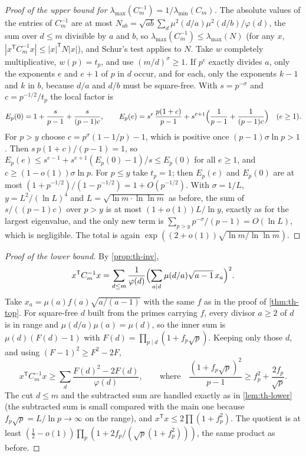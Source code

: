 \begin{proof}[Proof of the upper bound for $\lambda_{\max}(C_m^{-1}) = 1/\lambda_{\min}(C_m)$]
The absolute values of the entries of $C_m^{-1}$ are at most $N_{ab} = \sqrt{ab}\sum_d\mu^2(d/a)\mu^2(d/b)/\varphi(d)$, the sum over $d \le m$ divisible by $a$ and $b$, so $\lambda_{\max}(C_m^{-1}) \le \lambda_{\max}(N)$ (for any $x$, $|x^{\mathsf T}C_m^{-1}x| \le |x|^{\mathsf T}N|x|$), and Schur's test applies to $N$. Take $w$ completely multiplicative, $w(p) = t_p$, and use $(m/d)^\sigma \ge 1$. If $p^e$ exactly divides $a$, only the exponents $e$ and $e + 1$ of $p$ in $d$ occur, and for each, only the exponents $k - 1$ and $k$ in $b$, because $d/a$ and $d/b$ must be square-free. With $s = p^{-\sigma}$ and $c = p^{-1/2}/t_p$ the local factor is
\[
  E_p(0) = 1 + \frac{s}{p-1} + \frac{s}{(p-1)c}, \qquad E_p(e) = s^e\,\frac{p(1 + c)}{p-1} + s^{e+1}\Bigl(\frac{1}{p-1} + \frac{1}{(p-1)c}\Bigr) \quad (e \ge 1).
\]
For $p > y$ choose $c = p^\sigma(1 - 1/p) - 1$, which is positive once $(p-1)\sigma\ln p > 1$. Then $s\,p(1+c)/(p-1) = 1$, so $E_p(e) \le s^{e-1} + s^{e+1}(E_p(0) - 1)/s \le E_p(0)$ for all $e \ge 1$, and $c \ge (1 - o(1))\sigma\ln p$. For $p \le y$ take $t_p = 1$; then $E_p(e)$ and $E_p(0)$ are at most $(1 + p^{-1/2})/(1 - p^{-1/2}) = 1 + O(p^{-1/2})$. With $\sigma = 1/L$, $y = L^2/(\ln L)^4$ and $L = \sqrt{\ln m\cdot\ln\ln m}$ as before, the sum of $s/((p-1)c)$ over $p > y$ is at most $(1 + o(1))L/\ln y$, exactly as for the largest eigenvalue, and the only new term is $\sum_{p > y}p^{-\sigma}/(p-1) = O(\ln L)$, which is negligible. The total is again $\exp((2 + o(1))\sqrt{\ln m/\ln\ln m})$.
\end{proof}

\begin{proof}[Proof of the lower bound]
By \cref{prop:th-inv},
\[
  x^{\mathsf T}C_m^{-1}x = \sum_{d \le m}\frac{1}{\varphi(d)}\Bigl(\sum_{a \mid d}\mu(d/a)\sqrt{a-1}\,x_a\Bigr)^2.
\] Take $x_a = \mu(a)f(a)\sqrt{a/(a-1)}$ with the same $f$ as in the proof of \cref{thm:th-top}. For square-free $d$ built from the primes carrying $f$, every divisor $a \ge 2$ of $d$ is in range and $\mu(d/a)\mu(a) = \mu(d)$, so the inner sum is $\mu(d)(F(d) - 1)$ with $F(d) = \prod_{p \mid d}(1 + f_p\sqrt p)$. Keeping only those $d$, and using $(F - 1)^2 \ge F^2 - 2F$,
\[
  x^{\mathsf T}C_m^{-1}x \ge \sum_{d}\frac{F(d)^2 - 2F(d)}{\varphi(d)}, \qquad \text{where}\quad \frac{(1 + f_p\sqrt p)^2}{p-1} \ge f_p^2 + \frac{2f_p}{\sqrt p}.
\]
The cut $d \le m$ and the subtracted sum are handled exactly as in \cref{lem:th-lower} (the subtracted sum is small compared with the main one because $f_p\sqrt p = L/\ln p \to \infty$ on the range), and $x^{\mathsf T}x \le 2\prod(1 + f_p^2)$. The quotient is at least $(\frac12 - o(1))\prod_p(1 + 2f_p/(\sqrt p(1 + f_p^2)))$, the same product as before.
\end{proof}

